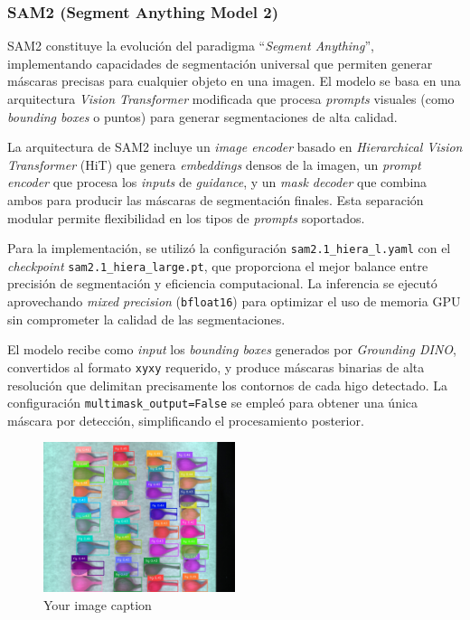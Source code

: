 \subsubsection{SAM2 (Segment Anything Model 2)}

SAM2 constituye la evolución del paradigma ``\emph{Segment Anything}'', implementando capacidades de segmentación universal que permiten generar máscaras precisas para cualquier objeto en una imagen. El modelo se basa en una arquitectura \emph{Vision Transformer} modificada que procesa \emph{prompts} visuales (como \emph{bounding boxes} o puntos) para generar segmentaciones de alta calidad.



La arquitectura de SAM2 incluye un \emph{image encoder} basado en \emph{Hierarchical Vision Transformer} (HiT) que genera \emph{embeddings} densos de la imagen, un \emph{prompt encoder} que procesa los \emph{inputs} de \emph{guidance}, y un \emph{mask decoder} que combina ambos para producir las máscaras de segmentación finales. Esta separación modular permite flexibilidad en los tipos de \emph{prompts} soportados.

Para la implementación, se utilizó la configuración \texttt{sam2.1\_hiera\_l.yaml} con el \emph{checkpoint} \texttt{sam2.1\_hiera\_large.pt}, que proporciona el mejor balance entre precisión de segmentación y eficiencia computacional. La inferencia se ejecutó aprovechando \emph{mixed precision} (\texttt{bfloat16}) para optimizar el uso de memoria GPU sin comprometer la calidad de las segmentaciones.

El modelo recibe como \emph{input} los \emph{bounding boxes} generados por \emph{Grounding DINO}, convertidos al formato \texttt{xyxy} requerido, y produce máscaras binarias de alta resolución que delimitan precisamente los contornos de cada higo detectado. La configuración \texttt{multimask\_output=False} se empleó para obtener una única máscara por detección, simplificando el procesamiento posterior.


\begin{figure}[h]
\centering
\includegraphics[width=0.5\textwidth]{images/dino_sam.jpg}
\caption{Your image caption}
\label{fig:your_label}
\end{figure}


